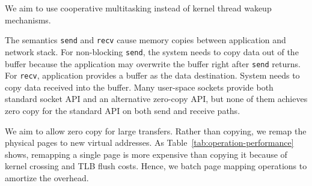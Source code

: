 We aim to use cooperative multitasking instead of kernel thread wakeup mechanisms.


The semantics \texttt{send} and \texttt{recv} cause memory copies between application and network stack. For non-blocking \texttt{send}, the system needs to copy data out of the buffer because the application may overwrite the buffer right after \texttt{send} returns. %
For \texttt{recv}, application provides a buffer as the data destination. %
System needs to copy data received into the buffer.
Many user-space sockets provide both standard socket API and an alternative zero-copy API, but none of them achieves zero copy for the standard API on both send and receive paths.

We aim to allow zero copy for large transfers. Rather than copying, we remap the physical pages to new virtual addresses. As Table~\ref{tab:operation-performance} shows, remapping a single page is more expensive than copying it because of kernel crossing and TLB flush costs. Hence, we batch page mapping operations to amortize the overhead.





